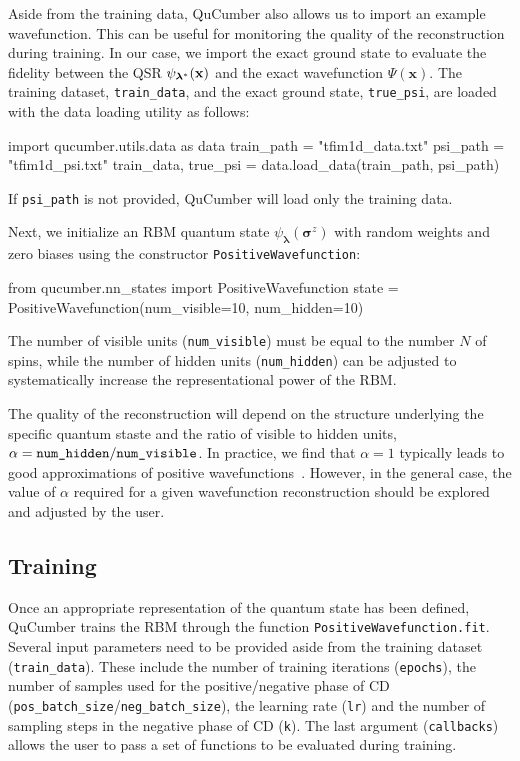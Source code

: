 \documentclass[submission, Phys, hidelnks]{SciPost}
\begin{document}
Aside from the training data, QuCumber also allows us to import an example wavefunction. This can be useful for monitoring the quality of the reconstruction during training. In our case, we import the exact ground state to evaluate the fidelity between the QSR $\psi_{\bm{\lambda}^*}(\bf{x})$ and the exact wavefunction $\Psi(\bm{x})$.
The training dataset, \verb|train_data|, and the exact ground state, \verb|true_psi|, are loaded with the data loading utility as follows:
\begin{python}
import qucumber.utils.data as data
train_path = "tfim1d_data.txt"
psi_path = "tfim1d_psi.txt"
train_data, true_psi = data.load_data(train_path, psi_path)
\end{python}
If \verb|psi_path| is not provided, QuCumber will load only the training data. 

Next, we initialize an RBM quantum state $\psi_{\bm{\lambda}}(\bm{\sigma}^z)$ with random weights and zero biases using the constructor \verb|PositiveWavefunction|:
\begin{python}
from qucumber.nn_states import PositiveWavefunction
state = PositiveWavefunction(num_visible=10, num_hidden=10)
\end{python}
The number of visible units (\verb|num_visible|) must be equal to the number $N$ of spins, while the number of hidden units (\verb|num_hidden|) can be adjusted to systematically increase the representational power of the RBM. 

The quality of the reconstruction will depend on the structure underlying the specific quantum staste and the ratio of visible to hidden units, $\alpha = \verb|num_hidden|/\verb|num_visible|$.
In practice, we find that $\alpha = 1$ typically leads to good approximations of positive wavefunctions~\cite{torlai2018tomography}. However, in the general case, the value of $\alpha$ required for a given wavefunction reconstruction should be explored and adjusted by the user.


\subsection{Training}
Once an appropriate representation of the quantum state has been defined, QuCumber trains the RBM through the function \verb|PositiveWavefunction.fit|. Several input parameters need to be provided aside from the training dataset (\verb|train_data|). These include the number of training iterations (\verb|epochs|), the number of samples used for the positive/negative phase of CD (\verb|pos_batch_size|/\verb|neg_batch_size|), the learning rate (\verb|lr|) and the number of sampling steps in the negative phase of CD (\verb|k|). The last argument (\verb|callbacks|) allows the user to pass a set of functions to be evaluated during training.
\end{document}
